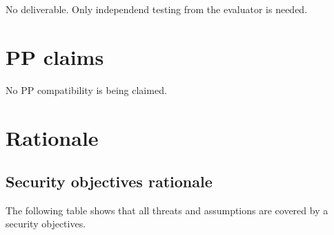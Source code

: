 \documentclass[12pt,english]{scrbook}
\begin{document}
No deliverable. Only independend testing from the evaluator is needed.





\chapter{PP claims}

No PP compatibility is being claimed.




\chapter{Rationale}





\section{Security objectives rationale}

The following table shows that all threats and assumptions are covered
by a security objectives. 
\end{document}
